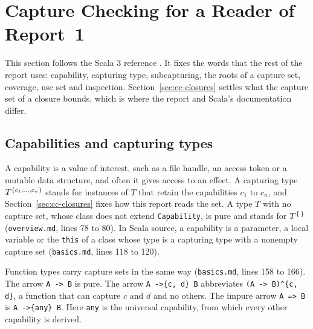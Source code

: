 \section{Capture Checking for a Reader of Report~1}\label{sec:cc}
\mathplain

This section follows the Scala 3 reference \cite{scala3cc}. It fixes the words that the rest of the report uses: capability, capturing type, subcapturing, the roots of a capture set, coverage, use set and inspection. Section~\ref{sec:cc-closures} settles what the capture set of a closure bounds, which is where the report and Scala's documentation differ.

\subsection{Capabilities and capturing types}\label{sec:cc-types}

A capability is a value of interest, such as a file handle, an access token or a mutable data structure, and often it gives access to an effect. A capturing type $T^{\{c_1, \ldots, c_n\}}$ stands for instances of $T$ that retain the capabilities $c_1$ to $c_n$, and Section~\ref{sec:cc-closures} fixes how this report reads the set. A type $T$ with no capture set, whose class does not extend \lstinline|Capability|, is pure and stands for $T^{\{\,\}}$ (\texttt{overview.md}, lines 78 to 80). In Scala source, a capability is a parameter, a local variable or the \lstinline|this| of a class whose type is a capturing type with a nonempty capture set (\texttt{basics.md}, lines 118 to 120).

Function types carry capture sets in the same way (\texttt{basics.md}, lines 158 to 166). The arrow \lstinline|A -> B| is pure. The arrow \lstinline|A ->{c, d} B| abbreviates \lstinline|(A -> B)^{c, d}|, a function that can capture $c$ and $d$ and no others. The impure arrow \lstinline|A => B| is \lstinline|A ->{any} B|. Here \lstinline|any| is the universal capability, from which every other capability is derived.

